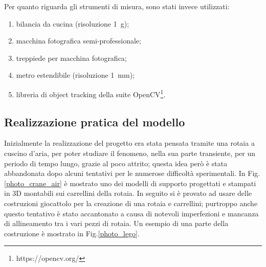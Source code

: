 \documentclass[11pt, a4paper, twoside]{article}
\begin{document}
Per quanto riguarda gli strumenti di misura, sono stati invece utilizzati:
\begin{enumerate}
  \item bilancia da cucina (risoluzione \SI{1}{\g});
  \item macchina fotografica semi-professionale;
  \item treppiede per macchina fotografica;
  \item metro estendibile (risoluzione \SI{1}{\milli\m});
  \item libreria di object tracking della suite OpenCV\footnote{https://opencv.org/}.
\end{enumerate}
\subsection{Realizzazione pratica del modello}
Inizialmente la realizzazione del progetto era stata pensata tramite 
una rotaia a cuscino d'aria, per poter studiare il fenomeno, nella sua parte transiente, 
per un periodo di tempo lungo, grazie al poco attrito; questa idea però è stata abbandonata dopo alcuni tentativi per
le numerose difficoltà sperimentali. In Fig.\ref{photo_crane_air} è mostrato uno dei modelli di supporto
progettati e stampati in 3D montabili sui carrellini della rotaia.
In seguito si è provato ad usare delle costruzioni giocattolo per la creazione di una rotaia
e carrellini; purtroppo anche questo tentativo è stato accantonato a causa di 
notevoli imperfezioni e mancanza di allineamento tra i vari pezzi di rotaia. 
Un esempio di una parte della costruzione è mostrato in Fig.\ref{photo_lego}.
\end{document}
